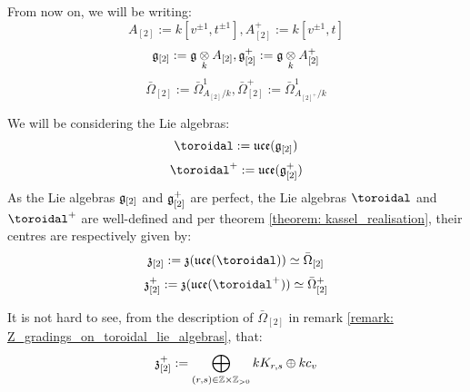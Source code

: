         \begin{convention}
            From now on, we will be writing:
                $$A_{[2]} := k[v^{\pm 1}, t^{\pm 1}], A_{[2]}^+ := k[v^{\pm 1}, t]$$
                $$\g_{[2]} := \g \tensor_k A_{[2]}, \g_{[2]}^+ := \g \tensor_k A_{[2]}^+$$
                $$\bar{\Omega}_{[2]} := \bar{\Omega}^1_{A_{[2]}/k}, \bar{\Omega}^+_{[2]} := \bar{\Omega}^1_{A_{[2]^+}/k}$$

            We will be considering the Lie algebras:
                $$\toroidal := \uce(\g_{[2]})$$
                $$\toroidal^+ := \uce(\g_{[2]}^+)$$
            As the Lie algebras $\mathfrak{g}_{[2]}$ and $\mathfrak{g}_{[2]}^+$ are perfect, the Lie algebras $\toroidal$ and $\toroidal^+$ are well-defined and per theorem \ref{theorem: kassel_realisation}, their centres are respectively given by:
                $$\z_{[2]} := \z(\uce(\toroidal)) \cong \bar{\Omega}_{[2]}$$
                $$\z_{[2]}^+ := \z(\uce(\toroidal^+)) \cong \bar{\Omega}_{[2]}^+$$
        \end{convention}
        \begin{remark}
            It is not hard to see, from the description of $\bar{\Omega}_{[2]}$ in remark \ref{remark: Z_gradings_on_toroidal_lie_algebras}, that:
                $$\z_{[2]}^+ := \bigoplus_{(r, s) \in \Z \x \Z_{> 0}} k K_{r, s} \oplus k c_v$$
        \end{remark}

